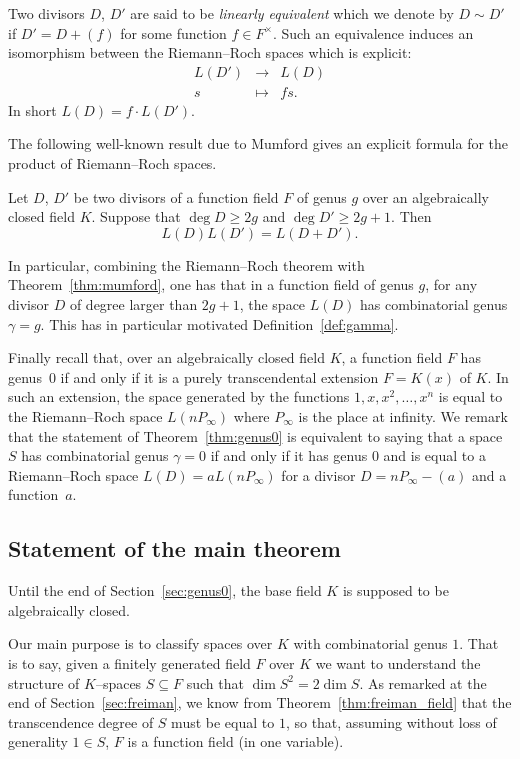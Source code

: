 \documentclass[ALCO,Unicode,ThmDefs]{cedram}
\newcommand{\map}[4]{
\begin{array}{ccc}
#1 & \longrightarrow & #2 \\
#3 & \longmapsto & #4
\end{array}
}
\renewcommand{\geq}{\geqslant}
\begin{document}
Two divisors $D$, $D'$ are said to be \emph{linearly equivalent} which we denote by $D \sim D'$ if $D'= D+(f)$ for some function $f \in F^\times$. Such an equivalence induces an isomorphism between the Riemann--Roch spaces which is explicit:
\[
\map{L(D')}{L(D)}{s}{fs.}
\]
In short $L(D)= f \cdot L(D')$.

The following well-known result due to Mumford gives an explicit formula for the product of Riemann--Roch spaces.

\begin{theo}\label{thm:mumford}
Let $D$, $D'$ be two divisors of a function field $F$ of genus $g$ {over an algebraically closed field $K$}. Suppose that $\deg D\geq2g$ and $\deg D'\geq2g+1$. Then
\[
L(D)L(D')= L(D+D').
\]
\end{theo}

In particular, combining the Riemann--Roch theorem with Theorem~\ref{thm:mumford}, one has that in a function field of genus $g$, for any divisor $D$ of degree larger than $2g+1$, the space $L(D)$ has combinatorial genus $\gamma=g$. This has in particular motivated Definition~\ref{def:gamma}.

Finally recall that, {over an algebraically closed field $K$}, a function field $F$ has genus~$0$ if and only if it is a purely transcendental extension $F=K(x)$ of $K$. In such an extension, the space generated by the functions $1,x,x^2,\ldots,x^n$ is equal to the Riemann--Roch space $L(nP_\infty)$ where $P_\infty$ is the place at infinity. We remark that the statement of Theorem~\ref{thm:genus0} is equivalent to saying that a space $S$ has combinatorial genus $\gamma=0$ if and only if it has genus $0$ and is equal to a Riemann--Roch space $L(D)=aL(nP_\infty)$ for a divisor $D=nP_\infty-(a)$ and a function~$a$.

\subsection{Statement of the main theorem}\label{sec:Vosper+1}
Until the end of Section~\ref{sec:genus0}, the base field $K$ is supposed to be algebraically closed.

Our main purpose is to classify spaces over $K$ with combinatorial genus $1$. That is to say, given a finitely generated field $F$ over $K$ we want to understand the structure of $K$--spaces $S \subseteq F$ such that $\dim S^2=2 \dim S$. As remarked at the end of Section~\ref{sec:freiman}, we know from Theorem~\ref{thm:freiman_field} that the transcendence degree of $S$ must be equal to $1$, so that, assuming without loss of generality $1\in S$, $F$ is a function field (in one variable).
\end{document}
